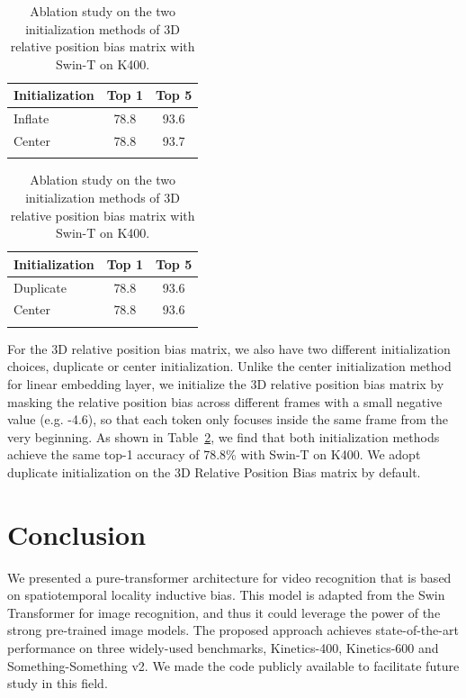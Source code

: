 \documentclass{article}
\begin{document}
\begin{table}[h]
\begin{minipage}{0.45\linewidth}
\centering
    \caption{Ablation study on the two initialization methods of linear embedding layer with Swin-T on K400.}
  \begin{tabular}{l|cc}
  \Xhline{1.0pt}
  Initialization & Top 1 & Top 5\\
  \hline
  Inflate & 78.8 & 93.6 \\
  Center & 78.8 & 93.7 \\
  \Xhline{1.0pt}
  \end{tabular}
  \label{table:init}
\end{minipage}\hfill
\begin{minipage}{0.45\linewidth}
\centering
    \caption{Ablation study on the two initialization methods of 3D relative position bias matrix with Swin-T on K400.}
  \begin{tabular}{l|cc}
  \Xhline{1.0pt}
  Initialization & Top 1 & Top 5\\
  \hline
  Duplicate & 78.8 & 93.6 \\
  Center & 78.8 & 93.6 \\
  \Xhline{1.0pt}
  \end{tabular}
  \label{table:init-pos}
\end{minipage}
\end{table}


For the 3D relative position bias matrix, we also have two different initialization choices, duplicate or center initialization. Unlike the center initialization method for linear embedding layer, we initialize the 3D relative position bias matrix by masking the relative position bias across different frames with a small negative value (e.g. -4.6), so that each token only focuses inside the same frame from the very beginning. As shown in Table~\ref{table:init-pos}, we find that both initialization methods achieve the same top-1 accuracy of 78.8\% with Swin-T on K400. We adopt duplicate initialization on the 3D Relative Position Bias matrix by default.


\section{Conclusion}
We presented a pure-transformer architecture for video recognition that is based on spatiotemporal locality inductive bias. This model is adapted from the Swin Transformer for image recognition, and thus it could leverage the power of the strong pre-trained image models. The proposed approach achieves state-of-the-art performance on three widely-used benchmarks, Kinetics-400, Kinetics-600 and Something-Something v2. We made the code publicly available to facilitate future study in this field.


\newpage



\end{document}
